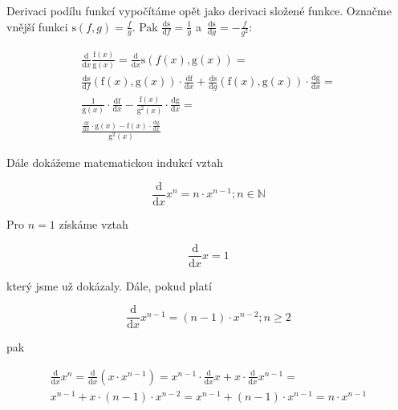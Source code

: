 Derivaci podílu funkcí vypočítáme opět jako derivaci složené funkce. Označme vnější funkci \(\mathrm{s}(f, g) = \frac{f}{g}\). Pak \(\frac{\mathrm{ds}}{\mathrm{d}f} = \frac{1}{g}\) a~\(\frac{\mathrm{ds}}{\mathrm{d}g} = -\frac{f}{g^2}\):

\begin{equation}
\begin{split}
\frac{\mathrm{d}}{\mathrm{d}x} \frac{\mathrm{f}(x)}{\mathrm{g}(x)} = \frac{\mathrm{d}}{\mathrm{d}x} \mathrm{s}({f}(x), \mathrm{g}(x)) = \\
\frac{\mathrm{ds}}{\mathrm{d}f} (\mathrm{f}(x), \mathrm{g}(x)) \cdot \frac{\mathrm{df}}{\mathrm{d}x} + \frac{\mathrm{ds}}{\mathrm{d}g}(\mathrm{f}(x), \mathrm{g}(x)) \cdot \frac{\mathrm{dg}}{\mathrm{d}x} = \\
\frac{1}{\mathrm{g}(x)} \cdot \frac{\mathrm{df}}{\mathrm{d}x} -\frac{\mathrm{f}(x)}{\mathrm{g}^2(x)} \cdot \frac{\mathrm{dg}}{\mathrm{d}x} = \\
\frac{\frac{\mathrm{df}}{\mathrm{d}x} \cdot \mathrm{g}(x) - \mathrm{f}(x) \cdot \frac{\mathrm{dg}}{\mathrm{d}x}}{\mathrm{g}^2(x)}
\end{split}
\end{equation}

Dále dokážeme matematickou indukcí vztah

\begin{equation}
\label{eq:derivace_mocniny_n}
\frac{\mathrm{d}}{\mathrm{d}x} x^n = n \cdot x^{n-1}; n \in \mathbb{N}
\end{equation}

Pro \(n = 1\) získáme vztah 

\begin{equation}
\frac{\mathrm{d}}{\mathrm{d}x} x = 1
\end{equation}

který jsme už dokázaly. Dále, pokud platí 

\begin{equation}
\frac{\mathrm{d}}{\mathrm{d}x} x^{n-1} = (n - 1) \cdot x^{n-2}; n \geq 2
\end{equation}

pak

\begin{equation}
\begin{split}
\frac{\mathrm{d}}{\mathrm{d}x} x^n = \frac{\mathrm{d}}{\mathrm{d}x} (x \cdot x^{n-1}) = x^{n-1} \cdot \frac{\mathrm{d}}{\mathrm{d}x} x + x \cdot \frac{\mathrm{d}}{\mathrm{d}x} x^{n-1} = \\
x^{n-1} + x \cdot (n - 1) \cdot x^{n-2} = x^{n-1} + (n - 1) \cdot x^{n-1} = n \cdot x^{n-1}
\end{split}
\end{equation}

